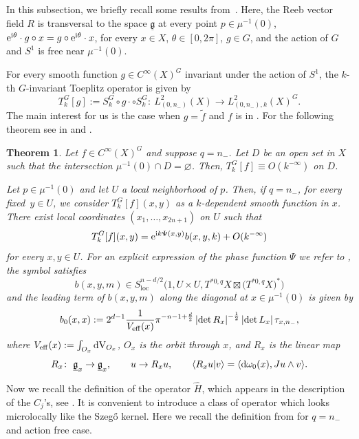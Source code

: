 \documentclass[10pt,a4paper]{amsart}
\numberwithin{equation}{section}
\newtheorem{Theorem}{Theorem}[section]
\newcommand{\abs}[1]{\left\vert#1\right\vert}
\newcommand{\To}{\rightarrow}
\begin{document}
	 In this subsection, we briefly recall some results from~\cite{gh}. Here, the Reeb vector field $R$ is transversal to the space $\underline{\mathfrak{g}}$ at every point $p\in\mu^{-1}(0)$,
${\rm e}^{{\rm i}\theta}\cdot g\circ x=g\circ {\rm e}^{{\rm i}\theta}\cdot x$, for every $ x\in X$, $\theta\in[0,2\pi]$, $ g\in G$,
	 and the action of $G$ and $S^1$ is free near $\mu^{-1}(0)$.
		
	For every smooth function $g\in{C}^\infty(X)^G$ invariant under the action of $S^1$, the $k$-th $G$-invariant Toeplitz operator is given by
	 \[
	 	T^G_{k}[g]:=S^{G}_{k}\circ g\cdot\circ S^{G}_{k}\colon\ L^2_{(0,n_-)}(X)\To L^2_{(0,n_-),k}(X)^G.
	 \]
	 The main interest for us is the case when $g=\tilde{f}$ and $f$ is in . For the following theorem see in \cite[Theorem 1.8]{hsiaohuang} and \cite{gh}.
	
	 \begin{Theorem} \label{thm:kfourierszego}
	 	Let $f\in{C}^\infty(X)^G$ and suppose $q= n_-$. Let $D$ be an open set in $X$ such that the intersection $\mu^{-1}(0)\cap D= \varnothing$. Then, $T^{G}_{k}[f]\equiv O(k^{-\infty})$ on $D$.
	 	
	 	Let $p\in \mu^{-1}(0)$ and let $U$ a local neighborhood of $p$. Then, if $q= n_-$, for every fixed~${y\in U}$, we consider $T_{k}^{G}[f](x,y)$ as a $k$-dependent smooth function in $x$. There exist local coordinates $(x_1,\dots ,x_{2n+1})$ on $U$ such that
	 	\[T^G_{k}[f](x, y)= {\rm e}^{{\rm i} k \Psi(x, y)} b(x, y, k)+O(k^{-\infty}) \]
	 	for every $x, y\in U$. For an explicit expression of the phase function $\Psi$ we refer to {\rm\cite{gh}}, the symbol satisfies
	 	\[b(x, y, m)\in S^{n-d/2}_{\mathrm{loc}}\bigl(1, U\times U, T^{*0,q}X\boxtimes\bigl(T^{*0,q}X\bigr)^*\bigr) \]
	 	and the leading term of $b(x,y,m)$ along the diagonal at $x\in\mu^{-1}(0)$ is given by
	 	\[b_0(x, x):= 2^{d-1}\frac{1}{V_{{\rm eff }}(x)}\pi^{-n-1+\frac{d}{2}}\abs{\det R_x}^{-\frac{1}{2}}\abs{\det{L}_{x}}\tau_{x,n_-},
 \]
	 	where
$V_{{\rm eff }}(x):=\int_{O_x}{\rm dV}_{O_x}$,
	 	$O_x$ is the orbit through $x$, and $R_x$ is the linear map
	 	\[
	 		R_x\colon\ \underline{\mathfrak{g}}_x\To\underline{\mathfrak{g}}_x,\qquad
	 		u\To R_xu,\qquad\langle R_xu | v \rangle=\langle {\rm d}\omega_0(x) , Ju\wedge v \rangle.
	 	\]
	 \end{Theorem}
	
 Now we recall the definition of the operator $\hat{H}$, which appears in the description of the $C_j$'s, see \cite{gh}. It is convenient to introduce a class of operator which looks microlocally like the Szeg\H{o} kernel. Here we recall the definition from \cite{gh} for $q=n_-$ and action free case.
\end{document}
